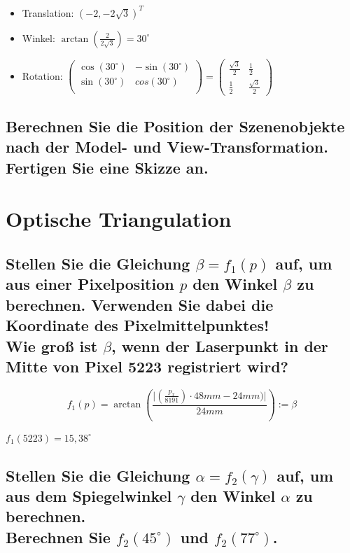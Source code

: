 \documentclass[a4paper,10pt,DIV=14]{scrartcl}
\newcommand{\dg}[1]{#1^\circ}
\begin{document}
\begin{itemize}
	\item Translation: $ (-2, -2\sqrt{3})^T $
	\item Winkel: $ \arctan(\frac{2}{2\sqrt{3}}) = \dg{30} $
	\item Rotation: $ \begin{pmatrix}	\cos(\dg{30}) & -\sin(\dg{30}) \\ \sin(\dg{30}) & cos(\dg{30}) \\ \end{pmatrix}
	= \begin{pmatrix} \frac{\sqrt{3}}{2} & \frac{1}{2} \\ \frac{1}{2} & \frac{\sqrt{3}}{2} \end{pmatrix} $
\end{itemize}


\subsection{Berechnen Sie die Position der Szenenobjekte nach der Model- und View-Transformation. Fertigen Sie eine Skizze an.}



\section{Optische Triangulation}

\subsection{Stellen Sie die Gleichung $\beta = f_1(p)$ auf, um aus einer Pixelposition $p$ den Winkel $\beta$ zu berechnen. Verwenden Sie dabei die Koordinate des Pixelmittelpunktes! \\ Wie groß ist $\beta$, wenn der Laserpunkt in der Mitte von Pixel 5223 registriert wird?}


$$f_1(p) = \arctan \left( \frac{\vert (\frac{p_x}{8191}) \cdot 48mm - 24mm) \vert}{24 mm} \right) := \beta $$

$f_1(5223) = \dg{15,38}$

\subsection{Stellen Sie die Gleichung $\alpha = f_2(\gamma)$ auf, um aus dem Spiegelwinkel $\gamma$ den Winkel $\alpha$ zu berechnen. \\ Berechnen Sie $f_2(45^\circ)$ und $f_2(77^\circ)$.}
\end{document}
